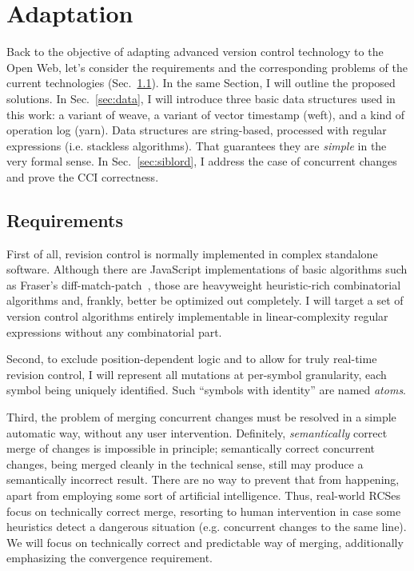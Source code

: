 \documentclass{sig-alternate}
\begin{document}
\section {Adaptation}   \label{sec:textile}

Back to the objective of adapting advanced version control technology to the Open Web, let's consider the requirements and the corresponding problems of the current technologies (Sec.~\ref{sec:req}). 
In the same Section, I will outline the proposed solutions.
In Sec.~\ref{sec:data}, I will introduce three basic data structures used in this work: a variant of weave, a variant of vector timestamp (weft), and a kind of operation log (yarn). Data structures are string-based, processed with regular expressions (i.e. stackless algorithms). That guarantees they are \emph{simple} in the very formal sense.
In Sec.~\ref{sec:siblord}, I address the case of concurrent changes and prove the CCI correctness.

\subsection {Requirements} \label{sec:req}
First of all, revision control is normally implemented in complex standalone software.
Although there are JavaScript implementations of basic algorithms such as Fraser's diff-match-patch~\cite{diff-match-patch}, those are heavyweight heuristic-rich combinatorial algorithms and, frankly, better be optimized out completely.
I will target a set of version control algorithms entirely implementable in linear-complexity regular expressions without any combinatorial part.

Second, to exclude position-dependent logic and to allow for truly real-time revision control, I will represent all mutations at per-symbol granularity, each symbol being uniquely identified.
Such ``symbols with identity'' are named \emph{atoms}.

Third, the problem of merging concurrent changes must be resolved in a simple automatic way, without any user intervention.
Definitely, \emph{semantically} correct merge of changes is impossible in principle; semantically correct concurrent changes, being merged cleanly in the technical sense, still may produce a semantically incorrect result.
There are no way to prevent that from happening, apart from employing some sort of artificial intelligence.
Thus, real-world RCSes focus on technically correct merge, resorting to human intervention in case some heuristics detect a dangerous situation (e.g. concurrent changes to the same line).
We will focus on technically correct and predictable way of merging, additionally emphasizing the convergence requirement.
\end{document}
